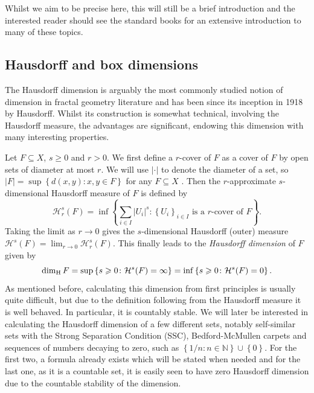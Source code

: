 Whilst we aim to be precise here, this will still be a brief introduction and the interested reader should see the standard books \cite{falconer, falconer2, mattila} for an extensive introduction to many of these topics. 



\subsection{Hausdorff and box dimensions}
\label{sec:intro-haus-box}

The Hausdorff dimension is arguably the most commonly studied notion of dimension in fractal geometry literature and has been since its inception in 1918 by Hausdorff. Whilst its construction is somewhat technical, involving the Hausdorff measure, the advantages are significant, endowing this dimension with many interesting properties. 

Let $F\subseteq X$, $s\ge 0$ and $r > 0$. We first define a $r$-cover of $F$ as a cover of $F$ by open sets of diameter at most $r$. We will use $\lvert \cdot \rvert$ to denote the diameter of a set, so $\lvert F \rvert = \sup \left\{d(x,y) \colon x,y \in F \right\}$ for any $F\subseteq X$ . Then the $r$-approximate $s$-dimensional Hausdorff measure of $F$ is defined by 
\[
\mathcal{H}^s_r (F) = \inf\left\{ \sum_{i\in I} \lvert U_i \rvert^s \colon \left\{U_i \right\}_{i\in I} \text{ is a $r$-cover of }F  \right\}.
\]
Taking the limit as $r \rightarrow 0 $ gives the $s$-dimensional Hausdorff (outer) measure $\mathcal{H}^s(F) = \lim_{r\rightarrow 0} \mathcal{H}^s_r(F)$. This finally leads to the \textit{Hausdorff dimension} of $F$ given by
\[
\dim_{\text{H}} F = \sup\left\{s \geqslant 0 \colon \mathcal{H}^s(F) = \infty\right\} = \inf\left\{s\geqslant 0 \colon \mathcal{H}^s(F) = 0\right\}.
\]
As mentioned before, calculating this dimension from first principles is usually quite difficult, but due to the definition following from the Hausdorff measure it is well behaved. In particular, it is countably stable. We will later be interested in calculating the Hausdorff dimension of a few different sets, notably self-similar sets with the Strong Separation Condition (SSC), Bedford-McMullen carpets and sequences of numbers decaying to zero, such as $\left\{1/n \colon n\in \mathbb{N}\right\}\cup \left\{ 0\right\}$. For the first two, a formula already exists which will be stated when needed and for the last one, as it is a countable set, it is easily seen to have zero Hausdorff dimension due to the countable stability of the dimension.


